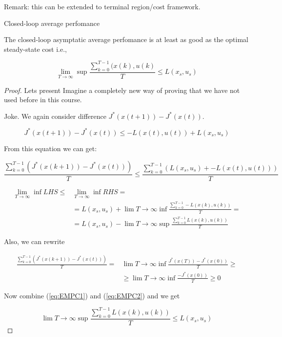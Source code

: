 Remark: this can be extended to terminal region/cost framework.

Closed-loop average perfomance

\begin{Theorem}
 The closed-loop asymptatic average perfomance is at least as good as the
 optimal steady-state cost i.e.,

 $$\lim_{T\rightarrow\infty}\sup\frac{\sum_{k=0}^{T-1}(x(k),u(k)}{T}\le L(x_s,u_s)$$

 \begin{proof}
  Lets present Imagine a completely new way of proving that we have not used before 
  in this course.

  Joke. We again consider difference $J^*(x(t+1))-J^*(x(t))$.

  $$J^*(x(t+1))-J^*(x(t))\le -L(x(t),u(t)) + L(x_s,u_s)$$

  From this equation we can get:

  $$\frac{\sum_{k=0}^{T-1}\left(J^*(x(k+1))-J^*(x(t))\right)}{T}\le\frac{\sum_{k=0}^{T-1}\left(L(x_s,u_s)+-L(x(t),u(t))\right)}{T}$$

  \begin{equation}\label{eq:EMPC1}
   \begin{split}
    \lim_{T\rightarrow\infty}\inf LHS \le &\lim_{T\rightarrow\infty}\inf RHS = \\
    &= L(x_s,u_s)+\lim{T\rightarrow\infty}\inf\frac{\sum_{k=0}^{T-1}-L(x(k),u(k))}{T} = \\
    &= L(x_s,u_s)-\lim{T\rightarrow\infty}\sup\frac{\sum_{k=0}^{T-1}L(x(k),u(k))}{T} 
   \end{split}
  \end{equation}

  Also, we can rewrite

  \begin{equation}\label{eq:EMPC2}
   \begin{split}
    \frac{\sum_{k=0}^{T-1}\left(J^*(x(k+1))-J^*(x(t))\right)}{T}=&\lim{T\rightarrow\infty}\inf\frac{J^*(x(T))-J^*(x(0))}{T} \ge \\
                       &\ge\lim{T\rightarrow\infty}\inf\frac{-J^*(x(0))}{T} \ge 0
   \end{split}
  \end{equation}

  Now combine (\ref{eq:EMPC1}) and (\ref{eq:EMPC2}) and we get

  $$\lim{T\rightarrow\infty}\sup\frac{\sum_{k=0}^{T-1}L(x(k),u(k))}{T} \le L(x_s,u_s)$$
 \end{proof}
\end{Theorem}


